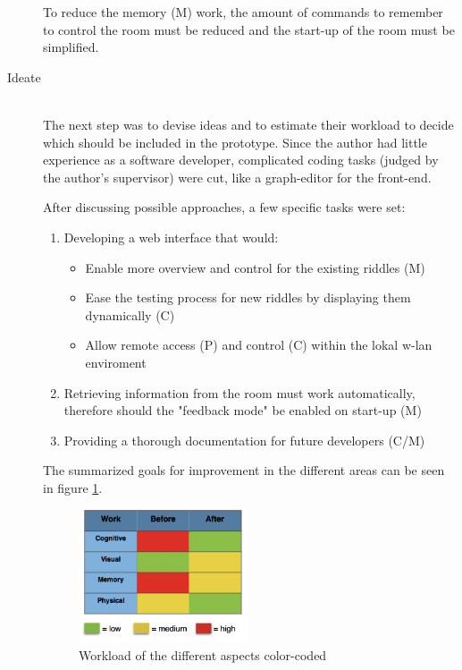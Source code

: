 \begin{description}
	To reduce the memory (M) work, the amount of commands to remember to control the room must be reduced and the start-up of the room must be simplified.

	\item [Ideate]\hfill \\
	The next step was to devise ideas and to estimate their workload to decide 
	which should be included in the prototype. Since the author had little experience as a software developer,
	complicated coding tasks (judged by the author's supervisor) were cut, 
	like a graph-editor for the front-end.

	After discussing possible approaches, a few specific tasks were set:
	      \begin{enumerate}
		      \item Developing a web interface that would:
		            \begin{itemize}
			            \item Enable more overview and control for the existing riddles (M)
			            \item Ease the testing process for new riddles by displaying them dynamically (C)
			            \item Allow remote access (P) and control (C) within the lokal w-lan enviroment
		            \end{itemize}
		      \item Retrieving information from the room must work automatically, therefore should the "feedback mode" be enabled on start-up (M)
		      \item Providing a thorough documentation for future developers  (C/M)
	      \end{enumerate}

	      The summarized goals for improvement in the different areas can be seen in figure \ref{fig:workload}.

	      \begin{figure}[th]
		      \centering
		      \includegraphics[width=50mm,scale=.5]{Figures/workload}
		      \decoRule
		      \caption[workload]{Workload of the different aspects color-coded}
		      \label{fig:workload}
	      \end{figure}


\end{description}
